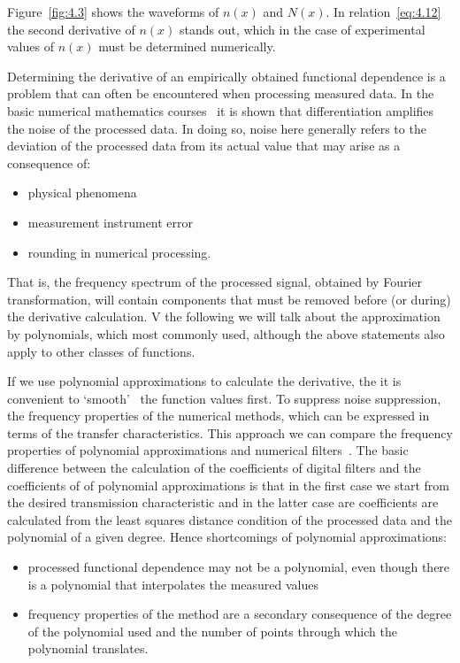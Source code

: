 Figure~\ref{fig:4.3} shows the waveforms of $n(x)$ and $N(x)$. In
relation~\ref{eq:4.12} the second derivative of $n(x)$ stands out,
which in the case of experimental values of $n(x)$ must be determined
numerically.

\par Determining the derivative of an empirically obtained functional
dependence is a problem that can often be encountered when processing
measured data. In the basic numerical mathematics courses~\cite{4.19}
it is shown that differentiation amplifies the noise of the processed
data. In doing so, noise here generally refers to the deviation of the
processed data from its actual value that may arise as a consequence
of:

\begin{itemize}
\item physical phenomena
\item measurement instrument error
\item rounding in numerical processing.
\end{itemize}

\par That is, the frequency spectrum of the processed signal, obtained
by Fourier transformation, will contain components that must be
removed before (or during) the derivative calculation. V the
following we will talk about the approximation by polynomials, which
most commonly used, although the above statements also apply to other
classes of functions.

\par If we use polynomial approximations to calculate the derivative,
the it is convenient to `smooth'~\cite{4.20} the function values
first. To suppress noise suppression, the frequency properties of the
numerical methods, which can be expressed in terms of the transfer
characteristics. This approach we can compare the frequency properties
of polynomial approximations and numerical filters~\cite{4.21}.  The
basic difference between the calculation of the coefficients of
digital filters and the coefficients of of polynomial approximations
is that in the first case we start from the desired transmission
characteristic and in the latter case are coefficients are calculated
from the least squares distance condition of the processed data and
the polynomial of a given degree. Hence shortcomings of polynomial
approximations:

\begin{itemize}
\item processed functional dependence may not be a polynomial, even
  though there is a polynomial that interpolates the measured values
\item frequency properties of the method are a secondary consequence
  of the degree of the polynomial used and the number of points
  through which the polynomial translates.
\end{itemize}

